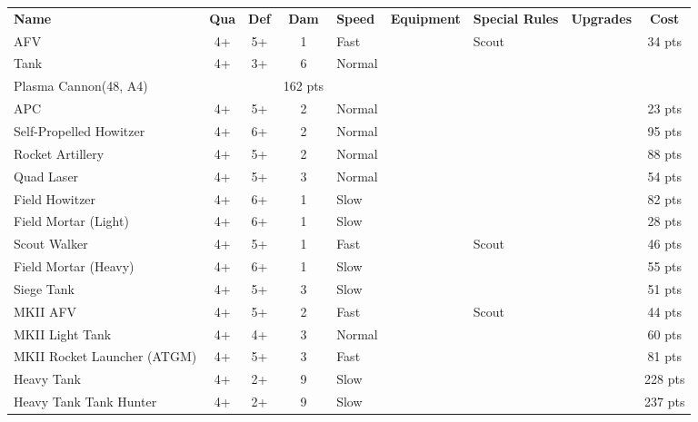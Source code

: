 \documentclass[11pt]{article}
\newcommand{\UnitTable}[1]{
  \centering
  \hyphenpenalty=100000
  \setlength\tabcolsep{2 pt}
  \rowcolors{1}{white}{lgrey}
  \footnotesize
  \begin{tabularx}{\linewidth}{lccclXXcc}
    \bf Name & \bf Qua& \bf Def& \bf Dam & \bf Speed &\bf Equipment& \bf Special Rules& \bf Upgrades& \bf Cost\\
    #1
  \end{tabularx}
}
\begin{document}
\UnitTable{

  AFV & 4+ & 5+ & 1 & Fast & \makecell[l]{Linked Light Cannons(36,
    A2, Linked)} & Scout & & 34 pts\\

  Tank & 4+ & 3+ & 6 & Normal & \makecell[l]{Heavy Cannon(72,
    A6),\\Plasma Cannon(48, A4)} & & & 162 pts\\

  APC & 4+ & 5+ & 2 & Normal & \makecell[l]{Tribarrel Cannon(24,
    A1)} & & & 23 pts\\

  Self-Propelled Howitzer & 4+ & 6+ & 2 & Normal &
  \makecell[l]{Howitzer(72, A6, Indirect)} & & & 95 pts\\

  Rocket Artillery & 4+ & 5+ & 2 & Normal & \makecell[l]{Rocket
    Barrage(60, A6, Indirect)} & & &	88 pts\\

  Quad Laser & 4+ & 5+ & 3 & Normal & \makecell[l]{Quad Laser(48,
    A4)} & & & 54 pts\\

  Field Howitzer & 4+ & 6+ & 1 & Slow & \makecell[l]{Howitzer(72,
    A6, Indirect)} & & & 82 pts\\

  Field Mortar (Light) & 4+ & 6+ & 1 & Slow & \makecell[l]{Light
    Mortar(48, A3, Indirect)} & & & 28 pts\\

  Scout Walker & 4+ & 5+ & 1 & Fast & \makecell[l]{Plasma Cannon(48,
    A4)} & Scout & & 46 pts \\

  Field Mortar (Heavy) & 4+ & 6+ & 1 & Slow & \makecell[l]{Heavy
    Mortar(48, A6, Indirect)} & & & 55 pts\\

  Siege Tank & 4+ & 5+ & 3 & Slow & \makecell[l]{Siege Cannon(24, A9)}
  & & & 51 pts\\

  MKII AFV & 4+ & 5+ & 2 & Fast &  \makecell[l]{Linked Light Cannons(36,
    A2, Linked)} & Scout & & 44 pts\\

  MKII Light Tank & 4+ & 4+ & 3 & Normal & \makecell[l]{Medium
    Cannon(48, A4)} & & & 60 pts\\

  MKII Rocket Launcher (ATGM) & 4+ & 5+ & 3 & Fast &
  \makecell[l]{ATGM(60, A6)} & & & 81 pts\\

  Heavy Tank & 4+ & 2+ & 9 & Slow & \makecell[l]{Linked Heavy Cannon(72,
    A6, Linked)} & & & 228 pts\\

  Heavy Tank Tank Hunter & 4+ & 2+ & 9 & Slow & \makecell[l]{High
    Velocity Heavy Cannon(72, A9)} & & & 237 pts\\

}
\end{document}
